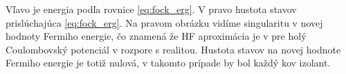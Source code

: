 \documentclass[
	11pt, %
]{beamer}
\begin{document}
\begin{frame}
\begin{figure}
    \vspace{-10mm}
    \label{fig:example}%
\end{figure}
\small
    Vľavo je energia podľa rovnice \eqref{eq:fock_erg}. V pravo hustota stavov prislúchajúca \eqref{eq:fock_erg}. Na pravom obrázku vidíme singularitu v novej hodnoty Fermiho energie, čo znamená že HF aproximácia je v pre holý Coulombovský potenciál v rozpore s realitou. Hustota stavov na novej hodnote Fermiho energie je totiž nulová, v takomto prípade by bol každý kov izolant.%
    \normalsize
\end{frame}
\end{document}
